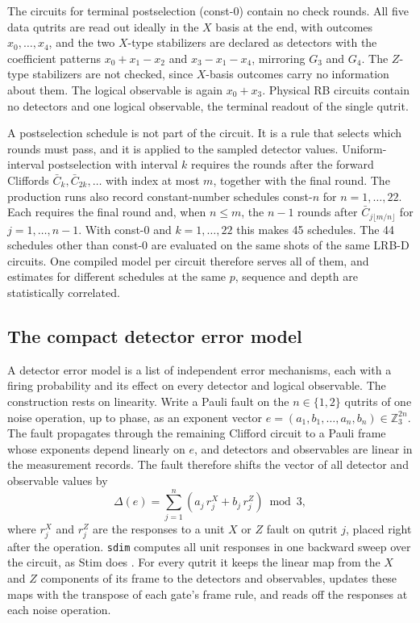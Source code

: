 The circuits for terminal postselection (const-0) contain no check rounds. All five data qutrits are read out ideally in the $X$ basis at the end, with outcomes $x_0, \dots, x_4$, and the two $X$-type stabilizers are declared as detectors with the coefficient patterns $x_0 + x_1 - x_2$ and $x_3 - x_1 - x_4$, mirroring $G_3$ and $G_4$. The $Z$-type stabilizers are not checked, since $X$-basis outcomes carry no information about them. The logical observable is again $x_0 + x_3$. Physical RB circuits contain no detectors and one logical observable, the terminal readout of the single qutrit.

A postselection schedule is not part of the circuit. It is a rule that selects which rounds must pass, and it is applied to the sampled detector values. Uniform-interval postselection with interval $k$ requires the rounds after the forward Cliffords $\bar C_k, \bar C_{2k}, \dots$ with index at most $m$, together with the final round. The production runs also record constant-number schedules const-$n$ for $n = 1, \dots, 22$. Each requires the final round and, when $n \le m$, the $n-1$ rounds after $\bar C_{j\lfloor m/n \rfloor}$ for $j = 1, \dots, n-1$. With const-0 and $k = 1, \dots, 22$ this makes 45 schedules. The 44 schedules other than const-0 are evaluated on the same shots of the same LRB-D circuits. One compiled model per circuit therefore serves all of them, and estimates for different schedules at the same $p$, sequence and depth are statistically correlated.

\subsection{The compact detector error model}

A detector error model is a list of independent error mechanisms, each with a firing probability and its effect on every detector and logical observable. The construction rests on linearity. Write a Pauli fault on the $n \in \{1,2\}$ qutrits of one noise operation, up to phase, as an exponent vector $e = (a_1, b_1, \dots, a_n, b_n) \in \mathbb{Z}_3^{2n}$. The fault propagates through the remaining Clifford circuit to a Pauli frame whose exponents depend linearly on $e$, and detectors and observables are linear in the measurement records. The fault therefore shifts the vector of all detector and observable values by
\begin{equation}
    \Delta(e) = \sum_{j=1}^{n} \left( a_j\, r^X_j + b_j\, r^Z_j \right) \bmod 3,
    \label{eq:dem-shift}
\end{equation}
where $r^X_j$ and $r^Z_j$ are the responses to a unit $X$ or $Z$ fault on qutrit $j$, placed right after the operation. \texttt{sdim} computes all unit responses in one backward sweep over the circuit, as Stim does \cite{Gidney2021Stim}. For every qutrit it keeps the linear map from the $X$ and $Z$ components of its frame to the detectors and observables, updates these maps with the transpose of each gate's frame rule, and reads off the responses at each noise operation.

